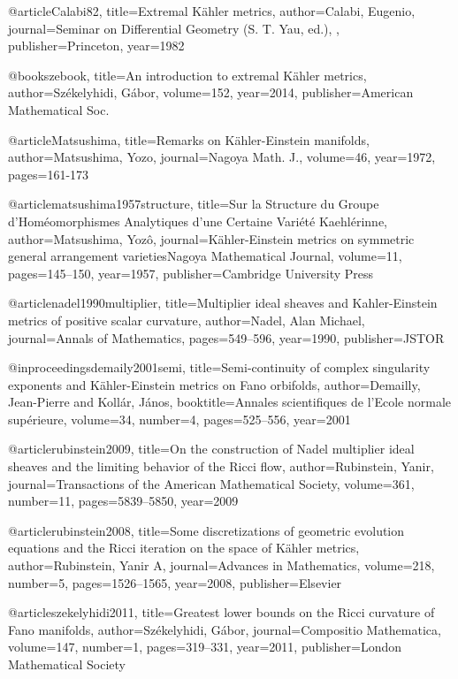 @article{Calabi82,
	title={Extremal {K}{\"a}hler metrics},
	author={Calabi, Eugenio},
	journal={Seminar on Differential Geometry (S. T. Yau, ed.), },
	publisher={Princeton},
	year={1982}
}

@book{szebook,
  title={An introduction to extremal {K}{\"a}hler metrics},
  author={Sz{\'e}kelyhidi, G{\'a}bor},
  volume={152},
  year={2014},
  publisher={American Mathematical Soc.}
}

@article{Matsushima,
title={Remarks on {K}{\"a}hler-{E}instein manifolds},
author={{M}atsushima, {Y}ozo},
journal={Nagoya {M}ath. {J}.},
volume={46},
year={1972},
pages={161-173}
}

@article{matsushima1957structure,
  title={Sur la Structure du Groupe d’Hom{\'e}omorphismes Analytiques d’une Certaine Vari{\'e}t{\'e} Kaehl{\'e}rinne},
  author={Matsushima, Yoz{\^o}},
  journal={Kähler-Einstein metrics on symmetric general arrangement varietiesNagoya Mathematical Journal},
  volume={11},
  pages={145--150},
  year={1957},
  publisher={Cambridge University Press}
}

@article{nadel1990multiplier,
  title={Multiplier ideal sheaves and Kahler-Einstein metrics of positive scalar curvature},
  author={Nadel, Alan Michael},
  journal={Annals of Mathematics},
  pages={549--596},
  year={1990},
  publisher={JSTOR}
}

@inproceedings{demaily2001semi,
  title={Semi-continuity of complex singularity exponents and K{\"a}hler-Einstein metrics on Fano orbifolds},
  author={Demailly, Jean-Pierre and Koll{\'a}r, J{\'a}nos},
  booktitle={Annales scientifiques de l'Ecole normale sup{\'e}rieure},
  volume={34},
  number={4},
  pages={525--556},
  year={2001}
}

@article{rubinstein2009,
  title={On the construction of Nadel multiplier ideal sheaves and the limiting behavior of the Ricci flow},
  author={Rubinstein, Yanir},
  journal={Transactions of the American Mathematical Society},
  volume={361},
  number={11},
  pages={5839--5850},
  year={2009}
}

@article{rubinstein2008,
  title={Some discretizations of geometric evolution equations and the Ricci iteration on the space of K{\"a}hler metrics},
  author={Rubinstein, Yanir A},
  journal={Advances in Mathematics},
  volume={218},
  number={5},
  pages={1526--1565},
  year={2008},
  publisher={Elsevier}
}


@article{szekelyhidi2011,
  title={Greatest lower bounds on the Ricci curvature of Fano manifolds},
  author={Sz{\'e}kelyhidi, G{\'a}bor},
  journal={Compositio Mathematica},
  volume={147},
  number={1},
  pages={319--331},
  year={2011},
  publisher={London Mathematical Society}
}

